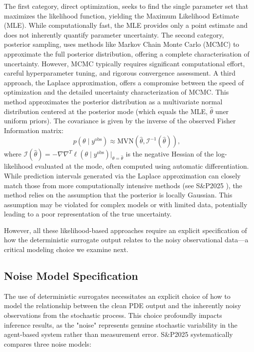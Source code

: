 \documentclass{article}
\newcommand{\SP}{S\&P2025 }
\begin{document}
The first category, direct optimization, seeks to find the single parameter set that maximizes the likelihood function, yielding the Maximum Likelihood Estimate (MLE). While computationally fast, the MLE provides only a point estimate and does not inherently quantify parameter uncertainty. The second category, posterior sampling, uses methods like Markov Chain Monte Carlo (MCMC) to approximate the full posterior distribution, offering a complete characterisation of uncertainty. However, MCMC typically requires significant computational effort, careful hyperparameter tuning, and rigorous convergence assessment. A third approach, the Laplace approximation, offers a compromise between the speed of optimization and the detailed uncertainty characterization of MCMC. This method approximates the posterior distribution as a multivariate normal distribution centered at the posterior mode (which equals the MLE, $\hat{\theta}$ uner uniform priors). The covariance is given by the inverse of the observed Fisher Information matrix:
\begin{equation}
	p(\theta \mid y^{\text{obs}}) \approx \text{MVN}(\hat{\theta}, \mathcal{I}^{-1}(\hat{\theta})),
\end{equation}
where $\mathcal{I}(\hat{\theta}) = -\nabla\nabla^T \ell(\theta \mid y^{\text{obs}})|_{\theta=\hat{\theta}}$ is the negative Hessian of the log-likelihood evaluated at the mode, often computed using automatic differentiation. While prediction intervals generated via the Laplace approximation can closely match those from more computationally intensive methods (see \SP), the method relies on the assumption that the posterior is locally Gaussian. This assumption may be violated for complex models or with limited data, potentially leading to a poor representation of the true uncertainty. 

However, all these likelihood-based approaches require an explicit specification of how the deterministic surrogate output relates to the noisy observational data—a critical modeling choice we examine next.


\subsection{Noise Model Specification}\label{sec:noise_model}

The use of deterministic surrogates necessitates an explicit choice of how to model the relationship between the clean PDE output and the inherently noisy observations from the stochastic process. This choice profoundly impacts inference results, as the "noise" represents genuine stochastic variability in the agent-based system rather than measurement error. S\&P2025 systematically compares three noise models:
\end{document}
